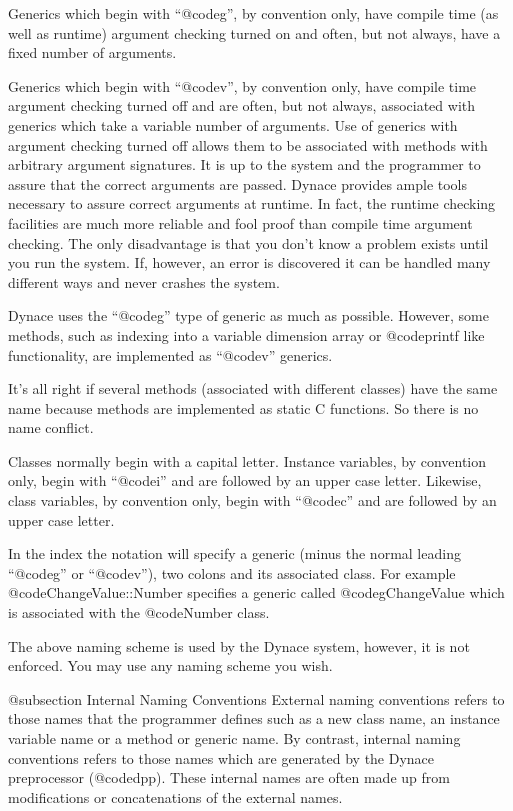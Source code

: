 Generics which begin with ``@code{g}'', by convention only, have compile
time (as well as runtime) argument checking turned on and often, but not
always, have a fixed number of arguments.

Generics which begin with ``@code{v}'', by convention only, have compile
time argument checking turned off and are often, but not always,
associated with generics which take a variable number of arguments.  Use
of generics with argument checking turned off allows them to be
associated with methods with arbitrary argument signatures.  It is up to
the system and the programmer to assure that the correct arguments are
passed.  Dynace provides ample tools necessary to assure correct
arguments at runtime.  In fact, the runtime checking facilities are much
more reliable and fool proof than compile time argument checking.  The
only disadvantage is that you don't know a problem exists until you run
the system.  If, however, an error is discovered it can be handled many
different ways and never crashes the system.

Dynace uses the ``@code{g}'' type of generic as much as possible.
However, some methods, such as indexing into a variable dimension
array or @code{printf} like functionality, are implemented as
``@code{v}'' generics.


It's all right if several methods (associated with different classes)
have the same name because methods are implemented as static C
functions.  So there is no name conflict.

Classes normally begin with a capital letter.  Instance variables, by
convention only, begin with ``@code{i}'' and are followed by an
upper case letter.  Likewise, class variables, by convention only, begin
with ``@code{c}'' and are followed by an upper case letter.

In the index the notation will specify a generic (minus the normal
leading ``@code{g}'' or ``@code{v}''), two colons and its associated
class.  For example @code{ChangeValue::Number} specifies a generic
called @code{gChangeValue} which is associated with the @code{Number}
class.

The above naming scheme is used by the Dynace system, however, it
is not enforced.  You may use any naming scheme you wish.

@subsection Internal Naming Conventions
External naming conventions refers to those names that the programmer
defines such as a new class name, an instance variable name or a method
or generic name.  By contrast, internal naming conventions refers to
those names which are generated by the Dynace preprocessor (@code{dpp}).
These internal names are often made up from modifications or
concatenations of the external names.

